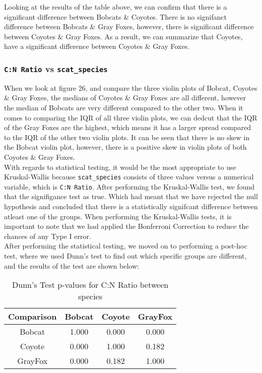 \documentclass[a4paper]{article}
\begin{document}
\noindent Looking at the results of the table above, we can confirm that there is a significant difference between Bobcats \& Coyotes. There is no signifanct
difference between Bobcats \& Gray Foxes, however, there is significant difference between Coyotes \& Gray Foxes. As a result, we can summarize that Coyotes,
have a significant difference between Coyotes \& Gray Foxes.

\subsubsection{\texttt{C:N Ratio} vs \texttt{scat\_species}}
When we look at figure 26, and compare the three violin plots of Bobcat, Coyotes \& Gray Foxes, the medians of Coyotes \& Gray Foxes are all different, 
however the median of Bobcats are very different compared to the other two. When it comes to comparing the IQR of all three violin plots, we can dedcut that 
the IQR of the Gray Foxes are the highest, which means it has a larger spread compared to the IQR of the other two violin plots. It can be seen that there is 
no skew in the Bobcat violin plot, however, there is a positive skew in violin plots of both Coyotes \& Gray Foxes. \\

\noindent With regards to statistical testing, it would be the most appropriate to use Kruskal-Wallis because \texttt{scat\_species} consists of three values
versus a numerical variable, which is \texttt{C:N Ratio}. After performing the Kruskal-Wallis test, we found that the signifigance test as true. Which had 
meant that we have rejected the null hypothesis and concluded that there is a statistically signifcant difference between atleast one of the groups. When 
performing the Kruskal-Wallis tests, it is important to note that we had applied the Bonferroni Correction to reduce the chances of any Type I error. \\

\noindent After performing the statistical testing, we moved on to performing a post-hoc test, where we used Dunn's test to find out which specific groups are
different, and the results of the test are shown below: \\

\begin{table}[h!]
    \centering
    \begin{tabular}{|c|c|c|c|}
    \hline
    \textbf{Comparison} & \textbf{Bobcat} & \textbf{Coyote} & \textbf{GrayFox} \\
    \hline
    Bobcat & 1.000 & 0.000 & 0.000 \\
    \hline
    Coyote & 0.000 & 1.000 & 0.182 \\
    \hline
    GrayFox & 0.000 & 0.182 & 1.000 \\
    \hline
    \end{tabular}
    \caption{Dunn's Test p-values for C:N Ratio between species}
    \label{tab:dunn_C_N_ratio}
\end{table}
\end{document}
